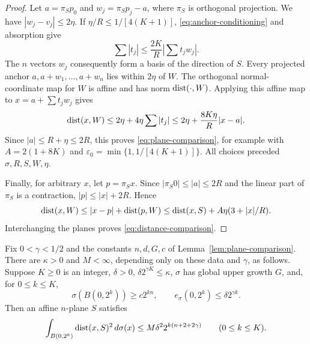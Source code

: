 \begin{proof}
Let $a=\pi_Sp_0$ and $w_j=\pi_Sp_j-a$, where $\pi_S$ is orthogonal
projection.  We have $|w_j-v_j|\le2\eta$.  If
$\eta/R\le1/[4(K+1)]$, \eqref{eq:anchor-conditioning} and absorption give
\[
 \sum|t_j|\le\frac{2K}{R}\left|\sum t_jw_j\right|.
\]
The $n$ vectors $w_j$ consequently form a basis of the direction of $S$.
Every projected anchor $a,a+w_1,\ldots,a+w_n$ lies within $2\eta$ of $W$.
The orthogonal normal-coordinate map for $W$ is affine and has norm
$\operatorname{dist}(\cdot,W)$.  Applying this affine map to
$x=a+\sum t_jw_j$ gives
\[
 \operatorname{dist}(x,W)\le2\eta+4\eta\sum|t_j|
 \le2\eta+\frac{8K\eta}{R}|x-a|.
\]
Since $|a|\le R+\eta\le2R$, this proves
\eqref{eq:plane-comparison}, for example with
$A=2(1+8K)$ and
$\varepsilon_0=\min\{1,1/[4(K+1)]\}$.
All choices preceded $\sigma,R,S,W,\eta$.

Finally, for arbitrary $x$, let $p=\pi_Sx$.  Since
$|\pi_S0|\le|a|\le2R$ and the linear part of $\pi_S$ is a contraction,
$|p|\le|x|+2R$.  Hence
\[
 \operatorname{dist}(x,W)\le|x-p|+\operatorname{dist}(p,W)
 \le\operatorname{dist}(x,S)+A\eta(3+|x|/R).
\]
Interchanging the planes proves \eqref{eq:distance-comparison}.
\end{proof}

\begin{lemma}
\label{lem:fixed-plane-moments}
Fix $0<\gamma<1/2$ and the constants $n,d,G,c$ of
Lemma~\ref{lem:plane-comparison}.  There are $\kappa>0$ and $M<\infty$,
depending only on these data and $\gamma$, as follows.  Suppose $K\ge0$ is
an integer, $\delta>0$, $\delta2^{\gamma K}\le\kappa$, $\sigma$ has
global upper growth $G$, and, for $0\le k\le K$,
\[
 \sigma(B(0,2^k))\ge c2^{kn},
 \qquad e_\sigma(0,2^k)\le\delta2^{\gamma k}.
\]
Then an affine $n$-plane $S$ satisfies
\begin{equation}\label{eq:fixed-plane-moments}
 \int_{B(0,2^k)}\operatorname{dist}(x,S)^2\,d\sigma(x)
 \le M\delta^2 2^{k(n+2+2\gamma)}
 \qquad(0\le k\le K).
\end{equation}
\end{lemma}

